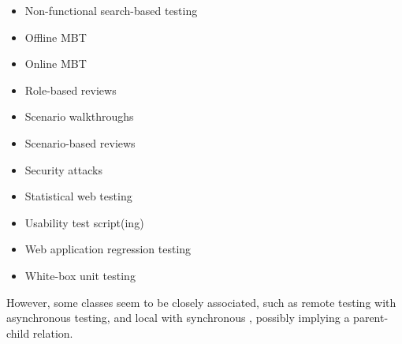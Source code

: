 \begin{itemize}
          \citealp[p.~356]{SakamotoEtAl2013})
    \item Non-functional search-based testing \citep[Tab.~1]{DoğanEtAl2014}
    \item Offline MBT \citepISTQB{}
    \item Online MBT \citepISTQB{}
    \item Role-based reviews \citepISTQB{}
    \item Scenario walkthroughs \citep[Fig.~4]{Gerrard2000a}
    \item Scenario-based reviews \citepISTQB{}
    \item Security attacks \citepISTQB{}
    \item Statistical web testing \citep[p.~185]{DoğanEtAl2014}
    \item Usability test script(ing) \citepISTQB{}
    \item Web application regression testing \cite[Tab.~21]{DoğanEtAl2014}
    \item White-box unit testing \citep[pp.~345-346]{SakamotoEtAl2013}
\end{itemize}

However, some classes seem to be closely associated, such as remote testing
with asynchronous testing, and local with synchronous \citep{JardEtAl1999},
possibly implying a parent-child relation.